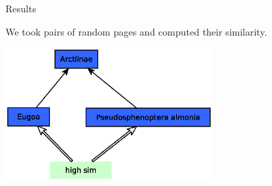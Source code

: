 \documentclass[xcolor=dvipsnames]{beamer}
\begin{document}
\begin{frame}{Results}

We took pairs of random pages and computed their similarity. 


\begin{center}

\includegraphics[width=0.6\textwidth, height=0.4\paperheight]{media/moths.eps}

\end{center}

\end{frame}
\end{document}
